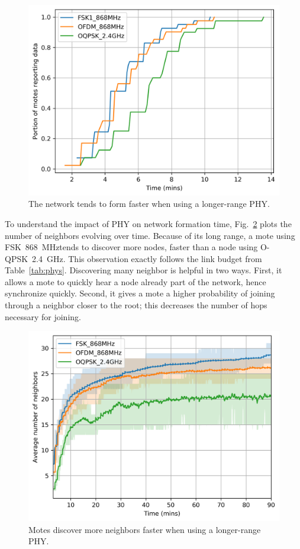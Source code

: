 \documentclass[sensors,article,submit,moreauthors,pdftex]{Definitions/mdpi}
\newcommand{\fsk}           {FSK~868~MHz}
\newcommand{\oqpsk}         {O-QPSK~2.4~GHz}
\newcommand{\figwidth}      {0.85}
\begin{document}
\begin{figure}
	\centering
	\includegraphics[width=\figwidth\columnwidth]{time_firstpacket_cdf}
	\caption{The network tends to form faster when using a longer-range PHY.}
    \label{fig:time_firstpacket_cdf}
\end{figure}


To understand the impact of PHY on network formation time, Fig.~\ref{fig:neighbors_time} plots the number of neighbors evolving over time.
Because of its long range, a mote using \fsk tends to discover more nodes, faster than a node using \oqpsk.
This observation exactly follows the link budget from Table~\ref{tab:phys}.
Discovering many neighbor is helpful in two ways.
First, it allows a mote to quickly hear a node already part of the network,
    hence synchronize quickly.
Second, it gives a mote a higher probability of joining through a neighbor closer to the root; this decreases the number of hops necessary for joining.

\begin{figure}
	\centering
	\includegraphics[width=0.85\columnwidth]{neighbors_time}
    \caption{Motes discover more neighbors faster when using a longer-range PHY.}
    \label{fig:neighbors_time}
\end{figure}
\end{document}
